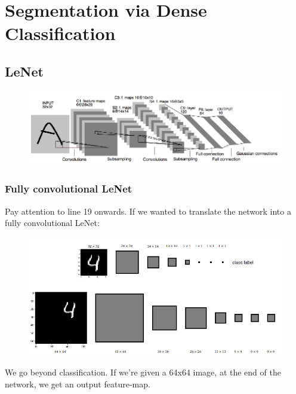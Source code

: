 \documentclass[11pt]{article}
\begin{document}
\section{Segmentation via Dense Classification}

\subsection{LeNet}

\begin{figure}[H]
    \centering
    \includegraphics[width=\linewidth]{figures/LeNet.png}
\end{figure}



\subsubsection{Fully convolutional LeNet}

Pay attention to line 19 onwards. If we wanted to translate the network into a fully convolutional LeNet:



\begin{figure}[H]
    \centering
    \includegraphics[width=.8\linewidth]{figures/LeNet-before-after.png}
\end{figure}

We go beyond classification. If we're given a 64x64 image, at the end of the network, we get an output feature-map. 
\end{document}
